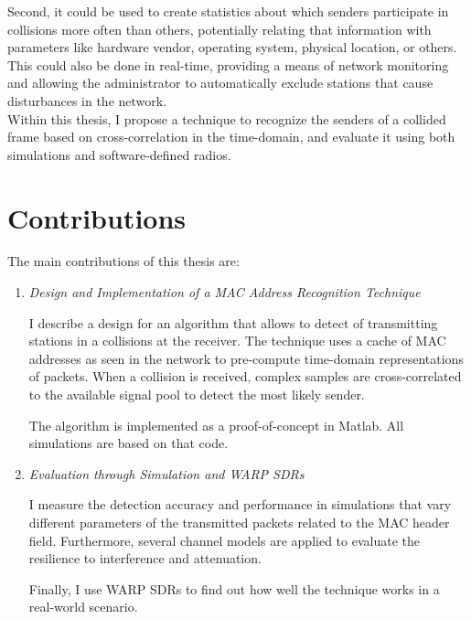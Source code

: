 Second, it could be used to create statistics about which senders participate in collisions more often than others, potentially relating that information with parameters like hardware vendor, operating system, physical location, or others. This could also be done in real-time, providing a means of network monitoring and allowing the administrator to automatically exclude stations that cause disturbances in the network.\\

Within this thesis, I propose a technique to recognize the senders of a collided frame based on cross-correlation in the time-domain, and evaluate it using both simulations and software-defined radios.

\clearpage



\section{Contributions}

The main contributions of this thesis are:

\begin{enumerate}
	\item \textit{Design and Implementation of a MAC Address Recognition Technique}

				I describe a design for an algorithm that allows to detect of transmitting stations in a collisions at the receiver. The technique uses a cache of \gls{MAC} addresses as seen in the network to pre-compute time-domain representations of packets. When a collision is received, complex samples are cross-correlated to the available signal pool to detect the most likely sender.

				The algorithm is implemented as a proof-of-concept in Matlab. All simulations are based on that code.

	\item \textit{Evaluation through Simulation and WARP SDRs}

				I measure the detection accuracy and performance in simulations that vary different parameters of the transmitted packets related to the \gls{MAC} header field. Furthermore, several channel models are applied to evaluate the resilience to interference and attenuation.

				Finally, I use \gls{WARP} \glspl{SDR} to find out how well the technique works in a real-world scenario.

\end{enumerate}


